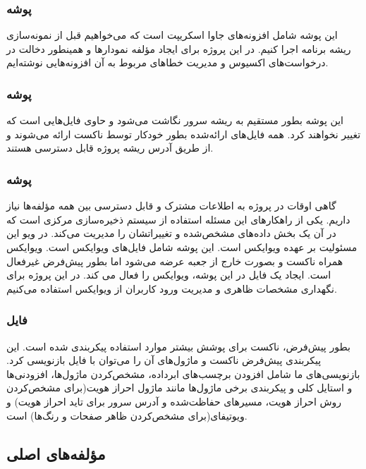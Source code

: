 \subsubsection{پوشه }

این پوشه شامل افزونه‌های جاوا اسکریپت است که می‌خواهیم قبل از نمونه‌سازی ریشه برنامه اجرا کنیم\cite{nuxt}. در این پروژه برای ایجاد مؤلفه نمودارها و همینطور دخالت در درخواست‌های اکسیوس و مدیریت خطاهای مربوط به آن افزونه‌هایی نوشته‌ایم.

\subsubsection{پوشه }

این پوشه بطور مستقیم به ریشه سرور نگاشت می‌شود و حاوی فایل‌هایی است که تغییر نخواهند کرد. همه فایل‌های ارائه‌شده بطور خودکار توسط ناکست ارائه می‌شوند و از طریق آدرس ریشه پروژه قابل دسترسی هستند\cite{nuxt}.

\subsubsection{پوشه }

گاهی اوقات در پروژه به اطلاعات مشترک و قابل دسترسی بین همه مؤلفه‌ها نیاز داریم. یکی از راهکارهای این مسئله استفاده از سیستم ذخیره‌سازی مرکزی است که در آن یک بخش داده‌های مشخص‌شده و تغییراتشان را مدیریت می‌کند. در ویو این مسئولیت بر عهده ویوایکس است. این پوشه شامل فایل‌های ویوایکس است. ویوایکس همراه ناکست و بصورت خارج از جعبه عرضه می‌شود اما بطور پیش‌فرض غیرفعال است. ایجاد یک فایل  در این پوشه، ویوایکس را فعال می کند\cite{nuxt}. در این پروژه برای نگهداری مشخصات ظاهری و مدیریت ورود کاربران از ویوایکس استفاده می‌کنیم.

\subsubsection{فایل }

بطور پیش‌فرض، ناکست برای پوشش بیشتر موارد استفاده پیکربندی شده است. این پیکربندی پیش‌فرض ناکست و ماژول‌های آن را می‌توان با فایل  بازنویسی کرد\cite{nuxt}. بازنویسی‌های ما شامل افزودن برچسب‌های ابرداده، مشخص‌کردن ماژول‌ها، افزودنی‌ها و استایل کلی و پیکربندی برخی ماژول‌ها مانند ماژول احراز هویت(برای مشخص‌کردن روش احراز هویت، مسیرهای حفاظت‌شده و آدرس سرور برای تاید احراز هویت) و ویوتیفای(برای مشخص‌کردن ظاهر صفحات و رنگ‌ها) است.

\subsection{مؤلفه‌های اصلی}

